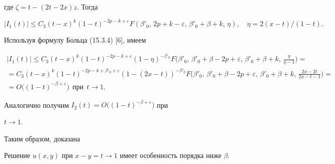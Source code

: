 где $\zeta=t-(2t-2x)z$. Тогда 


$$ 


|I_1(t)|\le C_3(t-x)^k(1-t)^{-2p-k+\varepsilon} 


F(\beta'_0,\,2p+k-\varepsilon,\,\beta'_0+\beta+k,\,\eta), 


\quad \eta=2(x-t)/(1-t). 


$$ 


Используя формулу Больца (15.3.4) [6], имеем 


\begin{gather*} 


|I_1(t)|\le C_3(t-x)^k(1-t)^{-2p-k+\varepsilon} 


(1-\eta)^{-\beta'_0}F\bigg(\beta'_0,\,\beta'_0+\beta-2p+\varepsilon, 


\,\beta'_0+\beta+k,\,\frac{\eta}{\eta-1}\bigg)=\\ 


% 


=C_3(t-x)^k(1-t)^{-2p-k+\beta'_0+\varepsilon} 


(1-(2x-t))^{-\beta'_0}F\bigg(\beta'_0,\, 


\beta'_0+\beta-2p+\varepsilon,\,\beta'_0+\beta+k,\, 


\frac{2x-2t}{2x-t-1}\bigg)=\\ 


=O\big((1-t)^{-\beta+\varepsilon}\big)\ \ 


\text{при}\ \ t\to1. 


\end{gather*} 


 


Аналогично получим $I_2(t)=O\big((1-t)^{-\beta+\varepsilon}\big)$ при 


$t\to1$. 


 


Таким образом, доказана 


 


\begin{thm} 


Решение $u(x,y)$ при $x-y=t\to1$ имеет особенность порядка ниже $\beta$. 


\end{thm} 


 


 


